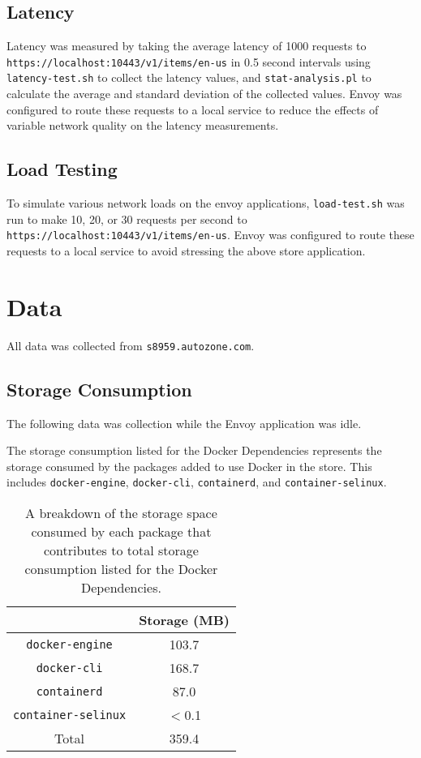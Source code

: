 \documentclass{article}
\begin{document}
\subsection{Latency}
Latency was measured by taking the average latency of 1000 requests to\\
\texttt{https://localhost:10443/v1/items/en-us} in 0.5 second intervals using\\
\texttt{latency-test.sh} to collect the latency values, and \texttt{stat-analysis.pl} to calculate the average and standard deviation of the collected values. Envoy was configured to route these requests to a local service to reduce the effects of variable network quality on the latency measurements.

\subsection{Load Testing}
To simulate various network loads on the envoy applications, \texttt{load-test.sh} was run to make 10, 20, or 30 requests per second to \texttt{https://localhost:10443/v1/items/en-us}. Envoy was configured to route these requests to a local service to avoid stressing the above store application.

\section{Data}
All data was collected from \texttt{s8959.autozone.com}.

\subsection{Storage Consumption}
The following data was collection while the Envoy application was idle.

The storage consumption listed for the Docker Dependencies represents the storage consumed by the packages added to use Docker in the store. This includes \texttt{docker-engine}, \texttt{docker-cli}, \texttt{containerd}, and \texttt{container-selinux}.

\begin{table}[H]
\begin{tabular}{ |c|c| }
 \hline
   & Storage (MB) \\ 
 \hline
 \texttt{docker-engine} & 103.7 \\
 \hline
 \texttt{docker-cli} & 168.7 \\
 \hline
 \texttt{containerd} & 87.0 \\
 \hline
 \texttt{container-selinux} & $<$0.1 \\
 \hline\hline
 Total & 359.4 \\
 \hline
\end{tabular}
\caption{A breakdown of the storage space consumed by each package that contributes to total storage consumption listed for the Docker Dependencies.}
\label{storage-breakdown}
\end{table}
\end{document}
